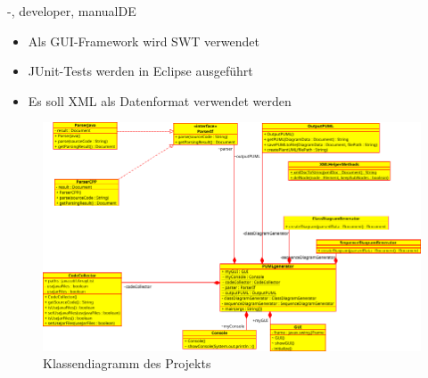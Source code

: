 \documentclass[twoside]{report}
\begin{document}
\begin{shownto}{-, developer, manualDE}
\begin{itemize}
\item Als GUI-Framework wird SWT verwendet
\item JUnit-Tests werden in Eclipse ausgeführt
\item Es soll XML als Datenformat verwendet werden
\end{itemize}
\nsecend

\begin{figure}[H]
\centering
\includegraphics[width=\textwidth]{Bilder/classDiagrammFinal.png}
\caption{Klassendiagramm des Projekts}
\end{figure}
\nsecend


\end{shownto}
\end{document}
